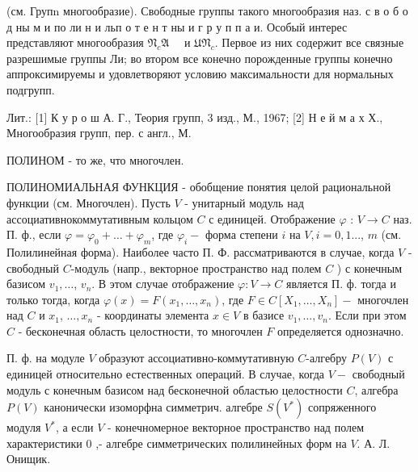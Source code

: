 \documentclass[10pt]{article}
\begin{document}
(см. Групn многообразие). Свободные группы такого многообразия наз. с в о б о д ны м и по ли н и льп о т е н т ны и г р у п п а и. Особый интерес представляют многообразия $\mathfrak{N}_{c} \mathfrak{A} \quad$ и $\mathfrak{U} \mathfrak{N}_{c}$. Первое из них содержит все связные разрешимые группы Ли; во втором все конечно порожденные группы конечно аппроксимируемы и удовлетворяют условию максимальности для нормальных подгрупп.



Лит.: [1] К у р о ш А. Г., Теория групп, 3 изд., М., 1967; [2] Н е й м а х Х., Многообразия групп, пер. с англ., М.



ПОЛИНОМ - то же, что многочлен.



ПОЛИНОМИАЛЬНАЯ ФУНКЦИЯ - обобщение понятия целой рациональной функции (см. Многочлен). Пусть $V$ - унитарный модуль над ассоциативнокоммутативным кольцом $C$ с единицей. Отображение $\varphi$ : $V \rightarrow C$ наз. П. ф., если $\varphi=\varphi_{0}+\ldots+\varphi_{m}$, где $\varphi_{i}-$ форма степени $i$ на $V, i=0,1$..., $m$ (см. Полилинейная форма). Наиболее часто П. Ф. рассматриваются в случае, когда $V$ - свободный $C$-модуль (напр., векторное пространство над полем $C$ ) с конечным базисом $v_{1}, \ldots$, $v_{n}$. В этом случае отображение $\varphi: V \rightarrow C$ является П. ф. тогда и только тогда, когда $\varphi(x)=F\left(x_{1}, \ldots, x_{n}\right)$, где $F \in C\left[X_{1}, \ldots, X_{n}\right]-$ многочлен над $C$ и $x_{1}$, $\ldots, x_{n}$ - координаты элемента $x \in V$ в базисе $v_{1}, \ldots, v_{n}$. Если при этом $C$ - бесконечная область целостности, то многочлен $F$ определяется однозначно.



П. ф. на модуле $V$ образуют ассоциативно-коммутативную $C$-алгебру $P(V)$ с единицей относительно естественных операций. В случае, когда $V-$ свободный модуль с конечным базисом над бесконечной областью целостности $C$, алгебра $P(V)$ канонически изоморфна симметрич. алгебре $S\left(V^{*}\right)$ сопряженного модуля $V^{*}$, а если $V$ - конечномерное векторное пространство над полем характеристики 0 ,- алгебре симметрических полилинейных форм на $V$. А. Л. Онищик.
\end{document}
